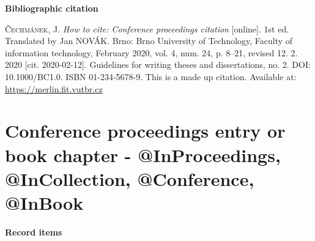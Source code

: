 \bigskip

\noindent \textbf{Bibliographic citation}

\medskip

\noindent \textsc{Čechmánek}, J. \textit{How to cite: Conference proceedings citation} [online]. 1st ed. Translated by Jan NOVÁK.
Brno: Brno University of Technology, Faculty of information technology, February 2020, vol. 4, num. 24, p. 8–21, revised 12. 2. 2020 [cit. 2020-02-12]. Guidelines for writing theses and dissertations, no. 2. DOI: 10.1000/BC1.0. ISBN 01-234-5678-9. This is a made up citation. Available at: \url{https://merlin.fit.vutbr.cz}
\newpage
\section*{Conference proceedings entry or book chapter - @InProceedings, @InCollection, @Conference, @InBook}
\label{pr-kapitola}
\noindent \textbf{Record items}

\medskip

